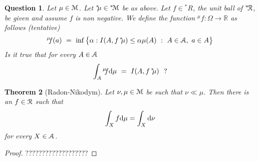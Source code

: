 \documentclass[12pt,letterpaper,oneside,reqno]{amsart}
\theoremstyle{plain}
\newtheorem{theorem}{Theorem}%
\newtheorem{fact}[theorem]{Fact}
\newtheorem{question}[theorem]{Question}
\theoremstyle{remark}
\renewcommand*{\emph}[1]{%
   \smash{\tikz[baseline]\node[rectangle, fill=olive!25, rounded corners, inner xsep=0.5ex, inner ysep=0.2ex, anchor=base, minimum height = 2.7ex]{#1};}}
\begin{document}
\begin{question}
  Let $\mu\in{\EuScript M}$.
  Let ${}^{*\!\!}\mu\in{}^{*\!}{\EuScript M}$ be as above.
  Let $f\in{}^{*\!\!}R$, the unit ball of ${}^{*\!}{\EuScript R}$, be given and assume $f$ is non negative.
  We define the function ${}^{\mu\!\!}f:\Omega\to{\mathds R}$ as follows (tentative)
  $$
  {}^{\mu\!\!}f(a)\ =\ \inf\big\{\alpha : I(A, f\,{}^{*\!\!}\mu)\le \alpha \mu(A) \ :\ A\in{\EuScript A},\ a\in A\big\}
  $$
  Is it true that for every $A\in{\EuScript A}$ 
  $$
  \int_A{}^{\mu\!\!}f{\rm d}\mu\ =\ I(A,f\,{}^{*\!\!}\mu)\ \ ?
  $$
\end{question}

\begin{theorem}[Radon-Nikodym] 
  Let $\nu,\mu\in{\EuScript M}$ be such that $\nu\ll\mu$.
  Then there is an $f\in{\EuScript R}$ such that 
  $$
  \int_X f{\rm d}\mu = \int_X {\rm d}\nu
  $$
  for every $X\in{\EuScript A}$.
\end{theorem}

\begin{proof}
  ???????????????????
\end{proof}











\end{document}
